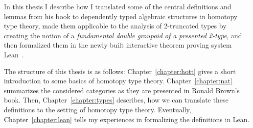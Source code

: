 In this thesis I describe how I translated some of the central definitions and
lemmas from his book to dependently typed algebraic structures in homotopy type
theory, made them applicable to the analysis of 2-truncated types by creating
the notion of a \emph{fundamental double groupoid of a presented 2-type},
and then formalized them in the newly built interactive theorem proving system
Lean~\cite{lean1}.

The structure of this thesis is as follows: Chapter~\ref{chapter:hott} gives
a short introduction to some basics of homotopy type theory. Chapter~\ref{chapter:nat}
summarizes the considered categories as they are presented in Ronald Brown's book.
Then, Chapter~\ref{chapter:types} describes, how we can translate these
definitions to the setting of homotopy type theory.
Eventually, Chapter~\ref{chapter:lean} tells my experiences in formalizing
the definitions in Lean.

